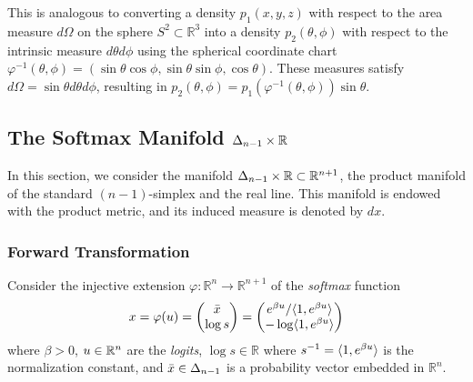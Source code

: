 This is analogous to converting a density $p_1(x,y,z)$ with respect to the area measure $d\Omega$ on the sphere $S^2 \subset \mathbb{R}^3$ into a density $p_2(\theta,\phi)$ with respect to the intrinsic measure $d\theta d\phi$ using the spherical coordinate chart $\varphi^{-1}(\theta,\phi) = (\sin\theta\cos\phi, \sin\theta\sin\phi, \cos\theta)$.
These measures satisfy $d\Omega = \sin\theta d\theta d\phi$, resulting in $p_2(\theta,\phi) = p_1(\varphi^{-1}(\theta,\phi)) \sin\theta$.

\subsection{The Softmax Manifold \texorpdfstring{$\Delta_{n-1} \times \mathbb{R}$}{DeltaNMinusOneTimesR}}\label{sec:supp:softmax_manifold}

In this section, we consider the manifold $\Delta_{n-1} \times \mathbb{R} \subset \mathbb{R}^{n+1}$, the product manifold of the standard $(n-1)$-simplex and the real line.
This manifold is endowed with the product metric, and its induced measure is denoted by $dx$.

\subsubsection{Forward Transformation}\label{sec:supp:xform_softmax}

Consider the injective extension $\varphi : \mathbb{R}^{n} \to \mathbb{R}^{n+1}$ of the \textit{softmax} function
\begin{align}\label{eqn:supp:softmax}
    x = \varphi(u) =
    \begin{pmatrix}
        \bar{x} \\
        \log s
    \end{pmatrix}
    =
    \begin{pmatrix}
        e^{\beta u} / \langle \mathrm{1}, e^{\beta u} \rangle \\
        -\log \langle \mathrm{1}, e^{\beta u} \rangle
    \end{pmatrix}
\end{align}
where $\beta > 0$, $u \in \mathbb{R}^{n}$ are the \textit{logits}, $\log s \in \mathbb{R}$ where $s^{-1} = \langle \mathrm{1}, e^{\beta u} \rangle$ is the normalization constant, and $\bar{x} \in \Delta_{n-1}$ is a probability vector embedded in $\mathbb{R}^{n}$.

